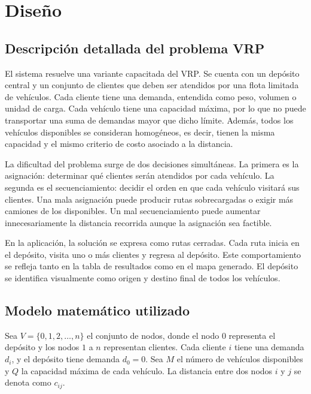 \documentclass[runningheads]{llncs}
\begin{document}
\section{Dise\~no}

\subsection{Descripci\'on detallada del problema VRP}

El sistema resuelve una variante capacitada del VRP. Se cuenta con un dep\'osito
central y un conjunto de clientes que deben ser atendidos por una flota limitada
de veh\'iculos. Cada cliente tiene una demanda, entendida como peso, volumen o
unidad de carga. Cada veh\'iculo tiene una capacidad m\'axima, por lo que no puede
transportar una suma de demandas mayor que dicho l\'imite. Adem\'as, todos los
veh\'iculos disponibles se consideran homog\'eneos, es decir, tienen la misma
capacidad y el mismo criterio de costo asociado a la distancia.

La dificultad del problema surge de dos decisiones simult\'aneas. La primera es
la asignaci\'on: determinar qu\'e clientes ser\'an atendidos por cada veh\'iculo. La
segunda es el secuenciamiento: decidir el orden en que cada veh\'iculo visitar\'a
sus clientes. Una mala asignaci\'on puede producir rutas sobrecargadas o exigir
m\'as camiones de los disponibles. Un mal secuenciamiento puede aumentar
innecesariamente la distancia recorrida aunque la asignaci\'on sea factible.

En la aplicaci\'on, la soluci\'on se expresa como rutas cerradas. Cada ruta inicia
en el dep\'osito, visita uno o m\'as clientes y regresa al dep\'osito. Este
comportamiento se refleja tanto en la tabla de resultados como en el mapa
generado. El dep\'osito se identifica visualmente como origen y destino final de
todos los veh\'iculos.

\subsection{Modelo matem\'atico utilizado}

Sea $V = \{0,1,2,\ldots,n\}$ el conjunto de nodos, donde el nodo $0$ representa
el dep\'osito y los nodos $1$ a $n$ representan clientes. Cada cliente $i$ tiene
una demanda $d_i$, y el dep\'osito tiene demanda $d_0=0$. Sea $M$ el n\'umero de
veh\'iculos disponibles y $Q$ la capacidad m\'axima de cada veh\'iculo. La distancia
entre dos nodos $i$ y $j$ se denota como $c_{ij}$.
\end{document}

